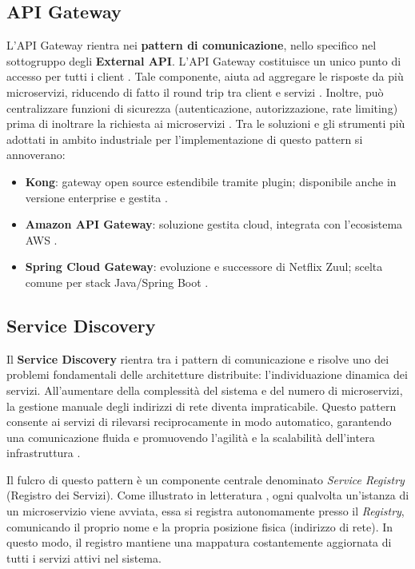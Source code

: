 \subsection*{API Gateway}
L'API Gateway rientra nei \textbf{pattern di comunicazione}, nello specifico nel sottogruppo degli \textbf{External API}.
L'API Gateway costituisce un unico punto di accesso per tutti i client \cite{richardson_sitoweb, medium_microservices_patterns_2020}. Tale componente, aiuta ad aggregare le risposte da più microservizi, riducendo di fatto il round trip tra client e servizi \cite{medium_microservices_patterns_2020}. Inoltre, può centralizzare funzioni di sicurezza (autenticazione, autorizzazione, rate limiting) prima di inoltrare la richiesta ai microservizi \cite{medium_microservices_patterns_2020, richardson_sitoweb}.
Tra le soluzioni e gli strumenti più adottati in ambito industriale per l'implementazione di questo pattern si annoverano:
\begin{itemize}
  \item \textbf{Kong}: gateway open source estendibile tramite plugin; disponibile anche in versione enterprise e gestita \cite{intesys_kong_gateway_2026}.
  \item \textbf{Amazon API Gateway}: soluzione gestita cloud, integrata con l'ecosistema AWS \cite{aws_apigateway_aws}.
  \item \textbf{Spring Cloud Gateway}: evoluzione e successore di Netflix Zuul; scelta comune per stack Java/Spring Boot \cite{prometheanz_zuul_to_scg}.
\end{itemize}

\subsection*{Service Discovery}
Il \textbf{Service Discovery} rientra tra i pattern di comunicazione e risolve uno dei problemi fondamentali delle architetture distribuite: l'individuazione dinamica dei servizi. All'aumentare della complessità del sistema e del numero di microservizi, la gestione manuale degli indirizzi di rete diventa impraticabile. Questo pattern consente ai servizi di rilevarsi reciprocamente in modo automatico, garantendo una comunicazione fluida e promuovendo l'agilità e la scalabilità dell'intera infrastruttura \cite{medium_microservices_patterns_2020}.

Il fulcro di questo pattern è un componente centrale denominato \textit{Service Registry} (Registro dei Servizi). Come illustrato in letteratura \cite{bff_discovery}, ogni qualvolta un'istanza di un microservizio viene avviata, essa si registra autonomamente presso il \textit{Registry}, comunicando il proprio nome e la propria posizione fisica (indirizzo di rete). In questo modo, il registro mantiene una mappatura costantemente aggiornata di tutti i servizi attivi nel sistema.

